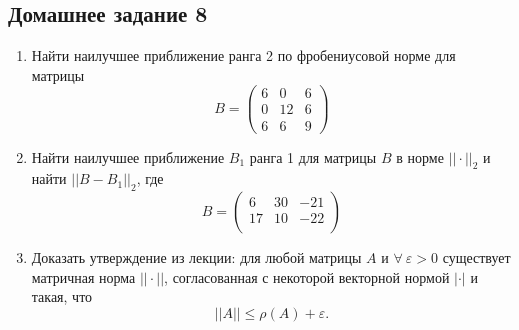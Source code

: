 \subsection{Домашнее задание 8}
\begin{enumerate}
    \item
    Найти наилучшее приближение ранга 2 по фробениусовой норме для матрицы 
    \[B = \begin{pmatrix}
    6 & 0 & 6\\
    0 & 12 & 6\\
    6 & 6 & 9
    \end{pmatrix}\]
    
    \item Найти наилучшее приближение $B_1$ ранга 1 для матрицы $B$ в норме $||\cdot||_2$ и найти $||B-B_1||_2$, где
    \[B = \begin{pmatrix}
    6 & 30 & -21\\
    17 & 10 & -22\\
    \end{pmatrix}\]
    
    \item Доказать утверждение из лекции: для любой матрицы $A$ и $\forall~ \varepsilon>0$ существует матричная норма $||\cdot ||$, согласованная с некоторой векторной нормой $|\cdot|$ и такая, что $$||A||\leqslant \rho(A) + \varepsilon .$$
\end{enumerate}